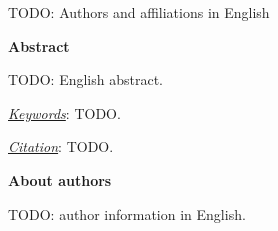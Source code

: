 \documentclass[10pt,a4paper]{article}
\begin{document}
\begin{center}
TODO: Authors and affiliations in English
\end{center}

\begin{center}
    {\bf Abstract}
\end{center}

TODO: English abstract.

\underline{\it{Keywords}}: TODO.

\underline{\it{Citation}}: TODO.

\begin{center}
    {\bf About authors}
\end{center}

TODO: author information in English.
\end{document}
